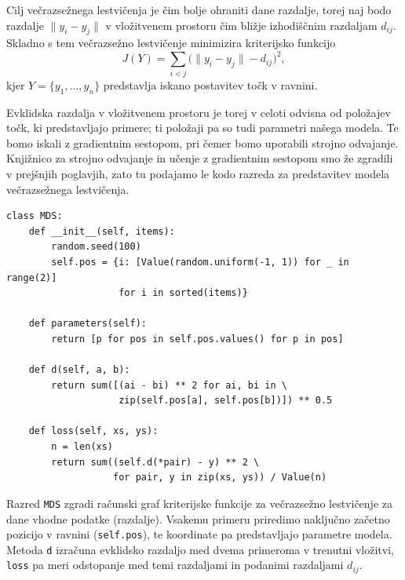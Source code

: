 Cilj večrazsežnega lestvičenja 
%
%
je čim bolje ohraniti dane razdalje, torej naj bodo razdalje \( \|y_i - y_j\| \) v vložitvenem prostoru čim bližje izhodiščnim razdaljam \( d_{ij} \). Skladno s tem večrazsežno lestvičenje minimizira kriterijsko funkcijo
\[
J(Y) = \sum_{i < j} \bigl( \|y_i - y_j\| - d_{ij} \bigr)^2,
\]
kjer \( Y = \{y_1, \dots, y_n\} \) predstavlja iskano postavitev točk v ravnini.

Evklidska razdalja v vložitvenem prostoru je torej v celoti odvisna od položajev točk, ki predstavljajo primere; ti položaji pa so tudi parametri našega modela. Te bomo iskali z gradientnim sestopom, pri čemer bomo uporabili strojno odvajanje. Knjižnico za strojno odvajanje in učenje z gradientnim sestopom smo že zgradili v prejšnjih poglavjih, zato tu podajamo le kodo razreda za predstavitev modela večrazsežnega lestvičenja.

\vspace*{3mm}
\begin{lstlisting}
class MDS:
    def __init__(self, items):
        random.seed(100)
        self.pos = {i: [Value(random.uniform(-1, 1)) for _ in range(2)]
                    for i in sorted(items)}
    
    def parameters(self):
        return [p for pos in self.pos.values() for p in pos]
    
    def d(self, a, b):
        return sum([(ai - bi) ** 2 for ai, bi in \
                    zip(self.pos[a], self.pos[b])]) ** 0.5

    def loss(self, xs, ys):
        n = len(xs)
        return sum((self.d(*pair) - y) ** 2 \
                   for pair, y in zip(xs, ys)) / Value(n)
\end{lstlisting}

Razred \texttt{MDS} zgradi računski graf kriterijske funkcije za večrazsežno lestvičenje za dane vhodne podatke (razdalje). Vsakemu primeru priredimo naključno začetno pozicijo v ravnini (\texttt{self.pos}), te koordinate pa predstavljajo parametre modela. Metoda \texttt{d} izračuna evklidsko razdaljo med dvema primeroma v trenutni vložitvi, \texttt{loss} pa meri odstopanje med temi razdaljami in podanimi razdaljami \( d_{ij} \). 

